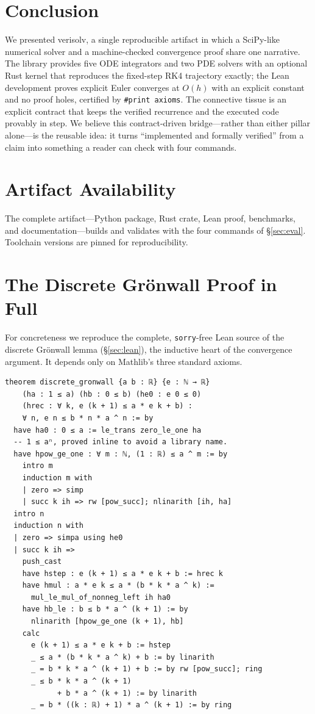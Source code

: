 \documentclass[sigplan,nonacm,screen,review]{acmart}
\begin{document}
\section{Conclusion}
\label{sec:conclusion}

We presented verisolv, a single reproducible artifact in which a SciPy-like
numerical solver and a machine-checked convergence proof share one narrative. The
library provides five ODE integrators and two PDE solvers with an optional Rust
kernel that reproduces the fixed-step RK4 trajectory exactly; the Lean development
proves explicit Euler converges at $O(h)$ with an explicit constant and no proof
holes, certified by \texttt{\#print axioms}. The connective tissue is an explicit
contract that keeps the verified recurrence and the executed code provably in
step. We believe this contract-driven bridge---rather than either pillar
alone---is the reusable idea: it turns ``implemented and formally verified'' from
a claim into something a reader can check with four commands.

\section*{Artifact Availability}
The complete artifact---Python package, Rust crate, Lean proof, benchmarks, and
documentation---builds and validates with the four commands of
\S\ref{sec:eval}. Toolchain versions are pinned for reproducibility.




\appendix
\section{The Discrete Grönwall Proof in Full}
\label{app:gronwall}
For concreteness we reproduce the complete, \texttt{sorry}-free Lean source of the
discrete Grönwall lemma (\S\ref{sec:lean}), the inductive heart of the convergence
argument. It depends only on Mathlib's three standard axioms.

\begin{lstlisting}[language=lean]
theorem discrete_gronwall {a b : ℝ} {e : ℕ → ℝ}
    (ha : 1 ≤ a) (hb : 0 ≤ b) (he0 : e 0 ≤ 0)
    (hrec : ∀ k, e (k + 1) ≤ a * e k + b) :
    ∀ n, e n ≤ b * n * a ^ n := by
  have ha0 : 0 ≤ a := le_trans zero_le_one ha
  -- 1 ≤ aⁿ, proved inline to avoid a library name.
  have hpow_ge_one : ∀ m : ℕ, (1 : ℝ) ≤ a ^ m := by
    intro m
    induction m with
    | zero => simp
    | succ k ih => rw [pow_succ]; nlinarith [ih, ha]
  intro n
  induction n with
  | zero => simpa using he0
  | succ k ih =>
    push_cast
    have hstep : e (k + 1) ≤ a * e k + b := hrec k
    have hmul : a * e k ≤ a * (b * k * a ^ k) :=
      mul_le_mul_of_nonneg_left ih ha0
    have hb_le : b ≤ b * a ^ (k + 1) := by
      nlinarith [hpow_ge_one (k + 1), hb]
    calc
      e (k + 1) ≤ a * e k + b := hstep
      _ ≤ a * (b * k * a ^ k) + b := by linarith
      _ = b * k * a ^ (k + 1) + b := by rw [pow_succ]; ring
      _ ≤ b * k * a ^ (k + 1)
            + b * a ^ (k + 1) := by linarith
      _ = b * ((k : ℝ) + 1) * a ^ (k + 1) := by ring
\end{lstlisting}
\end{document}
